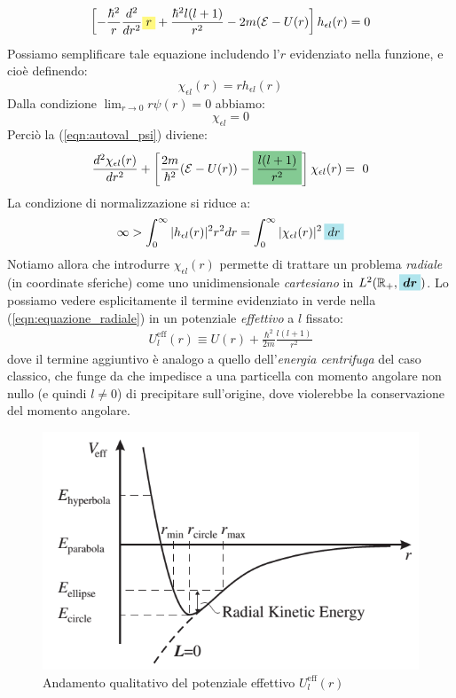 \documentclass[../../FisicaTeorica.tex]{subfiles}
\begin{document}
\begin{align}
\left[ - \frac{\hbar^2}{r}\frac{d^2}{dr^2} \hlc{Yellow}{r} + \frac{\hbar^2 l (l+1)}{r^2}-2m(\mathcal{E}-U(r)\right] h_{\epsilon l}(r) = 0
\label{eqn:autoval_psi}
\end{align}
Possiamo semplificare tale equazione includendo l'$r$ evidenziato nella funzione, e cioè definendo:
\[
\chi_{\epsilon l}(r) = rh_{\epsilon l}(r)
\]
Dalla condizione $\lim_{r\to 0}r \psi(r) = 0$ abbiamo:
\[
\chi_{\epsilon l } = 0
\]
Perciò la (\ref{eqn:autoval_psi}) diviene:
\begin{align}
\frac{d^2 \chi_{\epsilon l}(r)}{dr^2} + \left[
\frac{2m}{\hbar^2}(\mathcal{E}-U(r)) - \hlc{ForestGreen}{\frac{l(l+1)}{r^2}}\right] \chi_{\epsilon l}(r) =\ 0
\label{eqn:equazione_radiale}
\end{align}
La condizione di normalizzazione si riduce a:
\[
\infty > \int_0^\infty |h_{\epsilon l}(r)|^2 r^2 dr =\int_0^\infty |\chi_{\epsilon l}(r)|^2\,\hlc{SkyBlue}{dr}
\]
Notiamo allora che introdurre $\chi_{\epsilon l}(r)$ permette di trattare un problema \textit{radiale} (in coordinate sferiche) come uno unidimensionale \textit{cartesiano} in $L^2(\bb{R}_+, \hlc{SkyBlue}{\bm{dr}})$. Lo possiamo vedere esplicitamente  il termine evidenziato in verde nella (\ref{eqn:equazione_radiale}) in un potenziale \textit{effettivo} a $l$ fissato:
\begin{align*}
U^{\mathrm{eff}}_l(r) \equiv U(r) + \frac{\hbar^2}{2m}\frac{l(l+1)}{r^2}
\end{align*}
dove il termine aggiuntivo è analogo a quello dell'\textit{energia centrifuga} del caso classico, che funge da  che impedisce a una particella con momento angolare non nullo (e quindi $l\neq 0$) di precipitare sull'origine, dove violerebbe la conservazione del momento angolare.
\begin{figure}[H]
\centering
\includegraphics[scale=0.5]{Immagini/3_12/image001.png}
\caption{Andamento qualitativo del potenziale effettivo $U^{\mathrm{eff}}_l(r)$}
\end{figure}
\end{document}
